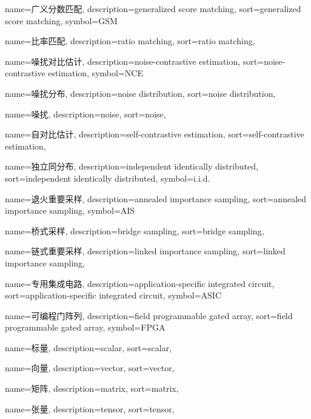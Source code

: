 {
  name=广义分数匹配,
  description={generalized score matching},
  sort={generalized score matching},
  symbol={GSM}
}

{
  name=比率匹配,
  description={ratio matching},
  sort={ratio matching},
}

{
  name=噪扰对比估计,
  description={noise-contrastive estimation},
  sort={noise-contrastive estimation},
  symbol={NCE}
}

{
  name=噪扰分布,
  description={noise distribution},
  sort={noise distribution},
}

{
  name=噪扰,
  description={noise},
  sort={noise},
}

{
  name=自对比估计,
  description={self-contrastive estimation},
  sort={self-contrastive estimation},
}

{
  name=独立同分布,
  description={independent identically distributed},
  sort={independent identically distributed},
  symbol={i.i.d.}
}

{
  name=退火重要采样,
  description={annealed importance sampling},
  sort={annealed importance sampling},
  symbol={AIS}
}

{
  name=桥式采样,
  description={bridge sampling},
  sort={bridge sampling},
}

{
  name=链式重要采样,
  description={linked importance sampling},
  sort={linked importance sampling},
}

{
  name=专用集成电路,
  description={application-specific integrated circuit},
  sort={application-specific integrated circuit},
  symbol={ASIC}
}

{
  name=可编程门阵列,
  description={field programmable gated array},
  sort={field programmable gated array},
  symbol={FPGA}
}

{
  name=标量,
  description={scalar},
  sort={scalar},
}

{
  name=向量,
  description={vector},
  sort={vector},
}

{
  name=矩阵,
  description={matrix},
  sort={matrix},
}

{
  name=张量,
  description={tensor},
  sort={tensor},
}

